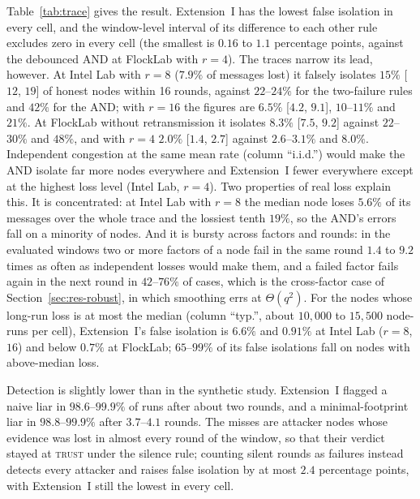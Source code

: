 Table~\ref{tab:trace} gives the result.  Extension~I has the lowest
false isolation in every cell, and the window-level interval of its
difference to each other rule excludes zero in every cell (the
smallest is $0.16$ to $1.1$ percentage points, against the debounced
AND at FlockLab with $r=4$).  The traces narrow its lead, however.  At
Intel Lab with $r=8$ ($7.9\%$ of messages lost) it falsely isolates
$15\%$ [$12$, $19$] of honest nodes within 16 rounds, against
$22$--$24\%$ for the two-failure rules and $42\%$ for the AND; with
$r=16$ the figures are $6.5\%$ [$4.2$, $9.1$], $10$--$11\%$ and $21\%$.
At FlockLab without retransmission it isolates $8.3\%$ [$7.5$, $9.2$]
against $22$--$30\%$ and $48\%$, and with $r=4$ $2.0\%$ [$1.4$, $2.7$]
against $2.6$--$3.1\%$ and $8.0\%$.  Independent congestion at the same
mean rate (column ``i.i.d.'') would make the AND isolate far more nodes
everywhere and Extension~I fewer everywhere except at the highest loss
level (Intel Lab, $r=4$).  Two properties of real loss explain this.
It is concentrated: at Intel Lab with $r=8$ the median node loses
$5.6\%$ of its messages over the whole trace and the lossiest tenth
$19\%$, so the AND's errors fall on a minority of nodes.  And it is
bursty across factors and rounds: in the evaluated windows two or more
factors of a node fail in the same round $1.4$ to $9.2$ times as often
as independent losses would make them, and a failed factor fails again
in the next round in $42$--$76\%$ of cases, which is the cross-factor
case of Section~\ref{sec:res-robust}, in which smoothing errs at
$\Theta(q^{2})$.  For the nodes whose long-run loss is at most the
median (column ``typ.'', about $10{,}000$ to $15{,}500$ node-runs per
cell), Extension~I's false isolation is $6.6\%$ and $0.91\%$ at Intel
Lab ($r=8$, $16$) and below $0.7\%$ at FlockLab; $65$--$99\%$ of its
false isolations fall on nodes with above-median loss.

Detection is slightly lower than in the synthetic study.  Extension~I
flagged a naive liar in $98.6$--$99.9\%$ of runs after about two rounds,
and a minimal-footprint liar in $98.8$--$99.9\%$ after $3.7$--$4.1$
rounds.  The misses are attacker nodes whose evidence was lost in
almost every round of the window, so that their verdict stayed at
\textsc{trust} under the silence rule; counting silent rounds as
failures instead detects every attacker and raises false isolation by
at most $2.4$ percentage points, with Extension~I still the lowest in
every cell.

